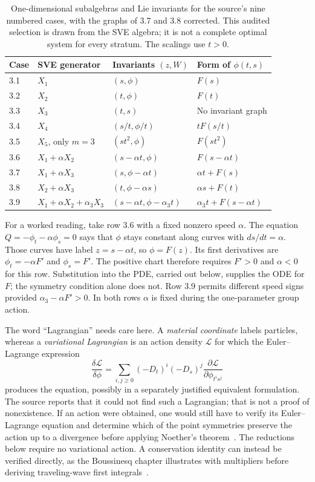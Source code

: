 \documentclass[11pt]{article}
\theoremstyle{definition}
\begin{document}
\begin{table}[htbp]
\centering\small
\begin{tabularx}{\linewidth}{@{}p{.85cm}p{3.3cm}p{3.0cm}X@{}}
\toprule
Case & SVE generator & Invariants $(z,W)$ & Form of $\phi(t,s)$\\
\midrule
3.1 & $X_1$ & $(s,\phi)$ & $F(s)$\\
3.2 & $X_2$ & $(t,\phi)$ & $F(t)$\\
3.3 & $X_3$ & $(t,s)$ & No invariant graph\\
3.4 & $X_4$ & $(s/t,\phi/t)$ & $tF(s/t)$\\
3.5 & $X_5$, only $m=3$ & $(st^2,\phi)$ & $F(st^2)$\\
3.6 & $X_1+\alpha X_2$ & $(s-\alpha t,\phi)$ & $F(s-\alpha t)$\\
3.7 & $X_1+\alpha X_3$ & $(s,\phi-\alpha t)$ & $\alpha t+F(s)$\\
3.8 & $X_2+\alpha X_3$ & $(t,\phi-\alpha s)$ & $\alpha s+F(t)$\\
3.9 & $X_1+\alpha X_2+\alpha_3X_3$ & $(s-\alpha t,\phi-\alpha_3t)$ & $\alpha_3t+F(s-\alpha t)$\\
\bottomrule
\end{tabularx}
\caption{One-dimensional subalgebras and Lie invariants for the source's
nine numbered cases, with the graphs of 3.7 and 3.8 corrected.
This audited selection is drawn from the SVE algebra; it is not a complete
optimal system for every stratum. The scalings use $t>0$.}
\label{tab:sve-repro-invariants}
\end{table}

For a worked reading, take row 3.6 with a fixed nonzero speed $\alpha$.
The equation $Q=-\phi_t-\alpha\phi_s=0$ says that $\phi$ stays
constant along curves with $ds/dt=\alpha$. Those curves have label
$z=s-\alpha t$, so $\phi=F(z)$. Its first derivatives are
$\phi_t=-\alpha F'$ and $\phi_s=F'$. The positive chart therefore
requires $F'>0$ and $\alpha<0$ for this row. Substitution into the PDE,
carried out below, supplies the ODE for $F$; the symmetry condition alone
does not. Row 3.9 permits different speed signs provided
$\alpha_3-\alpha F'>0$. In both rows $\alpha$ is fixed during the
one-parameter group action.

The word ``Lagrangian'' needs care here. A \emph{material coordinate}
labels particles, whereas a \emph{variational Lagrangian} is an action
density $\mathcal L$ for which the Euler--Lagrange expression
\[
 \frac{\delta\mathcal L}{\delta\phi}
 =\sum_{i,j\geq0}(-D_t)^i(-D_s)^j
       \frac{\partial\mathcal L}{\partial\phi_{t^is^j}}
\]
produces the equation, possibly in a separately justified equivalent
formulation. The source reports that it could not find such a
Lagrangian; that is not a proof of nonexistence. If an action were
obtained, one would still have to verify its Euler--Lagrange equation
and determine which of the point symmetries preserve the action up to a
divergence before applying Noether's theorem~\cite{noether}.
The reductions below require no variational action. A conservation
identity can instead be verified directly, as the Boussinesq chapter
illustrates with multipliers before deriving traveling-wave first
integrals~\cite[Sec.~4, pp.~166--169]{bruzon-gandarias-2021}.
\end{document}
